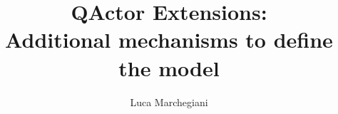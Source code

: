 \documentclass[12pt,a4paper]{article}
\title{\textbf{QActor Extensions:\\Additional mechanisms to define the model}}
\author{Luca Marchegiani}
\begin{document}
\maketitle







\appendix
\appendixpage


\end{document}
